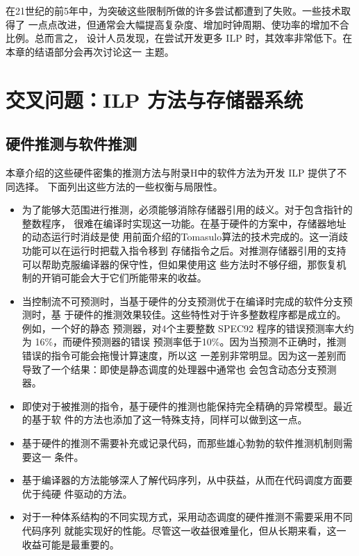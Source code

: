 在21世纪的前5年中，为突破这些限制所做的许多尝试都遭到了失败。一些技术取得了
一点点改进，但通常会大幅提高复杂度、增加时钟周期、使功率的增加不合比例。总而言之，
设计人员发现，在尝试开发更多 ILP 时，其效率非常低下。在本章的结语部分会再次讨论这一
主题。

\section{交叉问题：ILP 方法与存储器系统}
\subsection{硬件推测与软件推测}
本章介绍的这些硬件密集的推测方法与附录H中的软件方法为开发 ILP 提供了不同选择。
下面列出这些方法的一些权衡与局限性。

\begin{itemize}
    \item 为了能够大范围进行推测，必须能够消除存储器引用的歧义。对于包含指针的整数程序，
    很难在编译时实现这一功能。在基于硬件的方案中，存储器地址的动态运行时消歧是使
    用前面介绍的Tomasulo算法的技术完成的。这一消歧功能可以在运行时把载入指令移到
    存储指令之后。对推测存储器引用的支持可以帮助克服编译器的保守性，但如果使用这
    些方法时不够仔细，那恢复机制的开销可能会大于它们所能带来的收益。
    
    \item 当控制流不可预测时，当基于硬件的分支预测优于在编译时完成的软件分支预测时，基
    于硬件的推测效果较佳。这些特性对于许多整数程序都是成立的。例如，一个好的静态
    预测器，对4个主要整数 SPEC92 程序的错误预测率大约为 16\%，而硬件预测器的错误
    预测率低于10\%。因为当预测不正确时，推测错误的指令可能会拖慢计算速度，所以这
    一差别非常明显。因为这一差别而导致了一个结果：即使是静态调度的处理器中通常也
    会包含动态分支预测器。
    
    \item 即使对于被推测的指令，基于硬件的推测也能保持完全精确的异常模型。最近的基于软
    件的方法也添加了这一特殊支持，同样可以做到这一点。
    \item 基于硬件的推测不需要补充或记录代码，而那些雄心勃勃的软件推测机制则需要这一
    条件。
    \item 基于编译器的方法能够深人了解代码序列，从中获益，从而在代码调度方面要优于纯硬
    件驱动的方法。
    \item 对于一种体系结构的不同实现方式，采用动态调度的硬件推测不需要采用不同代码序列
    就能实现好的性能。尽管这一收益很难量化，但从长期来看，这一收益可能是最重要的。
\end{itemize}

